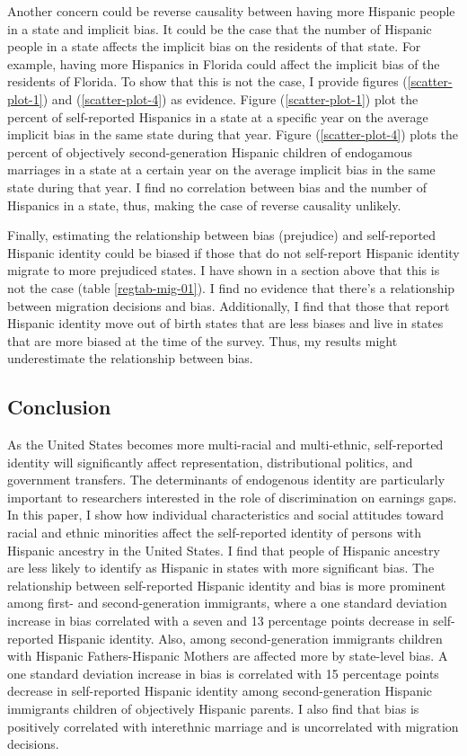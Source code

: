 \documentclass[12pt, fullpage]{article}
\begin{document}
Another concern could be reverse causality between having more Hispanic people in a state and implicit bias. It could be the case that the number of Hispanic people in a state affects the implicit bias on the residents of that state. For example, having more Hispanics in Florida could affect the implicit bias of the residents of Florida. To show that this is not the case, I provide figures (\ref{scatter-plot-1}) and (\ref{scatter-plot-4}) as evidence. Figure (\ref{scatter-plot-1}) plot the percent of self-reported Hispanics in a state at a specific year on the average implicit bias in the same state during that year. Figure (\ref{scatter-plot-4}) plots the percent of objectively second-generation Hispanic children of endogamous marriages in a state at a certain year on the average implicit bias in the same state during that year. I find no correlation between bias and the number of Hispanics in a state, thus, making the case of reverse causality unlikely. 

Finally, estimating the relationship between bias (prejudice) and self-reported Hispanic identity could be biased if those that do not self-report Hispanic identity migrate to more prejudiced states. I have shown in a section above that this is not the case (table \ref{regtab-mig-01}). I find no evidence that there's a relationship between migration decisions and bias. Additionally, I find that those that report Hispanic identity move out of birth states that are less biases and live in states that are more biased at the time of the survey. Thus, my results might underestimate the relationship between bias. 

\subsection{Conclusion}\label{sec:conc}

As the United States becomes more multi-racial and multi-ethnic, self-reported identity will significantly affect representation, distributional politics, and government transfers. The determinants of endogenous identity are particularly important to researchers interested in the role of discrimination on earnings gaps. In this paper, I show how individual characteristics and social attitudes toward racial and ethnic minorities affect the self-reported identity of persons with Hispanic ancestry in the United States. I find that people of Hispanic ancestry are less likely to identify as Hispanic in states with more significant bias. The relationship between self-reported Hispanic identity and bias is more prominent among first- and second-generation immigrants, where a one standard deviation increase in bias correlated with a seven and 13 percentage points decrease in self-reported Hispanic identity. Also, among second-generation immigrants children with Hispanic Fathers-Hispanic Mothers are affected more by state-level bias. A one standard deviation increase in bias is correlated with 15 percentage points decrease in self-reported Hispanic identity among second-generation Hispanic immigrants children of objectively Hispanic parents. I also find that bias is positively correlated with interethnic marriage and is uncorrelated with migration decisions.
\end{document}
